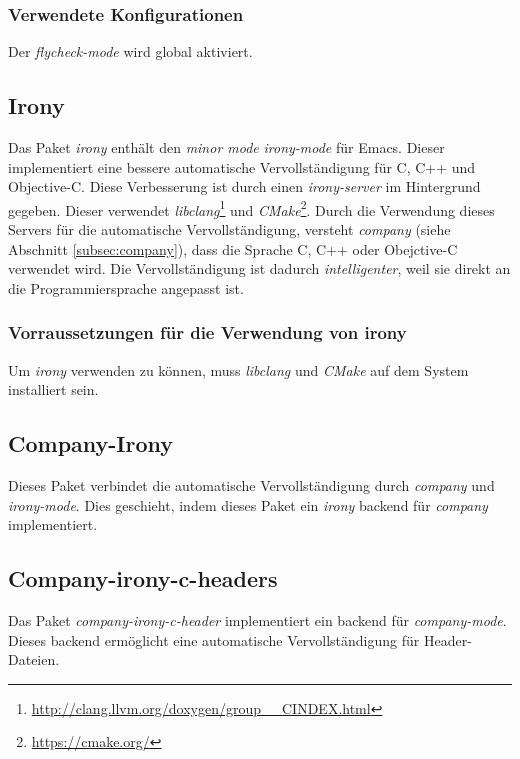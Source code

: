 \subsubsection{Verwendete Konfigurationen}
Der \textit{flycheck-mode} wird global aktiviert.\\

\subsection{Irony}
\label{subsec:irony}
Das Paket \textit{irony} enthält den \textit{minor mode}
\textit{irony-mode} für Emacs. Dieser implementiert eine bessere
automatische Vervollständigung für C, C++ und Objective-C. Diese
Verbesserung ist durch einen \textit{irony-server} im Hintergrund
gegeben. Dieser verwendet
\textit{libclang}\footnote{\url{http://clang.llvm.org/doxygen/group__CINDEX.html}}
und \textit{CMake}\footnote{\url{https://cmake.org/}}. Durch die
Verwendung dieses Servers für die automatische Vervollständigung,
versteht \textit{company} (siehe Abschnitt \ref{subsec:company}), dass
die Sprache C, C++ oder Obejctive-C verwendet wird. Die
Vervollständigung ist dadurch \textit{intelligenter}, weil sie direkt
an die Programmiersprache angepasst ist. \cite{Irony}\\

\subsubsection{Vorraussetzungen für die Verwendung von irony}
Um \textit{irony} verwenden zu können, muss \textit{libclang} und
\textit{CMake} auf dem System installiert sein.\\

\subsection{Company-Irony}
\label{subsec:companyirony}
Dieses Paket verbindet die automatische Vervollständigung durch
\textit{company} und \textit{irony-mode}. Dies geschieht, indem dieses
Paket ein \textit{irony} backend für \textit{company}
implementiert. \cite{CompanyIrony}\\

\subsection{Company-irony-c-headers}
\label{subsec:companyironycheaders}
Das Paket \textit{company-irony-c-header} implementiert ein backend
für \textit{company-mode}. Dieses backend ermöglicht eine automatische
Vervollständigung für Header-Dateien. \cite{CompanyIronyCHeaders}\\

